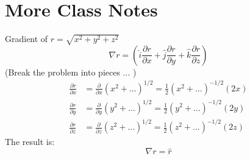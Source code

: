 \documentclass{beamer}
\begin{document}
\section{More Class Notes}

\begin{frame}{Gradient of $r = \sqrt{x^2 + y^2  + z^2}$}
\begin{equation}
\nabla r = \left(\hat{i}\frac{\partial r}{\partial x} + \hat{j}\frac{\partial r}{\partial y} + \hat{k}\frac{\partial r}{\partial z}\right)
\end{equation}
(Break the problem into pieces ... )
\begin{align}
\frac{\partial r}{\partial x} &= \frac{\partial }{\partial x} (x^2 + ... )^{1/2} = \frac{1}{2}(x^2 + ... )^{-1/2}(2x) \\
\frac{\partial r}{\partial y} &= \frac{\partial }{\partial y} (y^2 + ... )^{1/2} = \frac{1}{2}(y^2 + ... )^{-1/2}(2y) \\
\frac{\partial r}{\partial z} &= \frac{\partial }{\partial z} (z^2 + ... )^{1/2} = \frac{1}{2}(z^2 + ... )^{-1/2}(2z)
\end{align}
The result is:
\begin{equation}
\nabla r = \hat{r}
\end{equation}
\end{frame}
\end{document}
